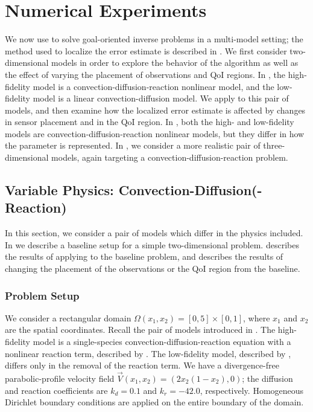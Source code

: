 \documentclass[review,sort&compress]{elsarticle}
\theoremstyle{plain} %
\theoremstyle{definition} %
\begin{document}
\section{Numerical Experiments}\label{sec:numexp}
%
We now use  to solve goal-oriented inverse problems in a multi-model setting; the method used to localize the error estimate is described in . We first consider two-dimensional models in order to explore the behavior of the algorithm as well as the effect of varying the placement of observations and QoI regions. In , the high-fidelity model is a convection-diffusion-reaction nonlinear model, and the low-fidelity model is a linear convection-diffusion model. We apply  to this pair of models, and then examine how the localized error estimate is affected by changes in sensor placement and in the QoI region. In , both the high- and low-fidelity models are convection-diffusion-reaction nonlinear models, but they differ in how the parameter is represented. In , we consider a more realistic pair of three-dimensional models, again targeting a convection-diffusion-reaction problem.

\subsection{Variable Physics: Convection-Diffusion(-Reaction)} \label{sec:cdvcdr}
In this section, we consider a pair of models which differ in the physics included. In  we describe a baseline setup for a simple two-dimensional problem.  describes the results of applying  to the baseline problem, and  describes the results of changing the placement of the observations or the QoI region from the baseline.
%
\subsubsection{Problem Setup} \label{sec:cdvcdrSetup}
%
We consider a rectangular domain $\Omega(x_1,x_2)=[0,5]\times[0,1]$, where $x_1$ and $x_2$ are the spatial coordinates. Recall the pair of models introduced in . The high-fidelity model is a single-species convection-diffusion-reaction equation with a nonlinear reaction term, described by . The low-fidelity model, described by , differs only in the removal of the reaction term. We have a divergence-free parabolic-profile velocity field $\vec{V}(x_1,x_2) = (2x_2(1-x_2),0)$; the diffusion and reaction coefficients are $k_d = 0.1$ and $k_r = -42.0$, respectively. Homogeneous Dirichlet boundary conditions are applied on the entire boundary of the domain. 
\end{document}
